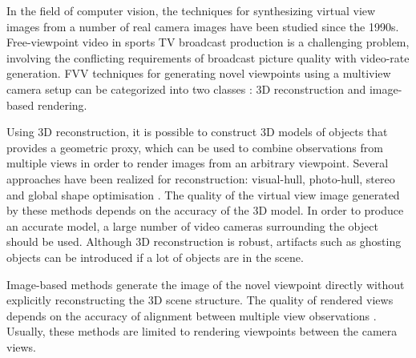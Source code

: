 In the field of computer vision, the techniques for synthesizing virtual view images from a number of real camera
images have been studied since the 1990s.
Free-viewpoint video in sports TV broadcast production is a challenging problem, involving the conflicting requirements of 
broadcast picture quality with video-rate generation.
FVV techniques for generating novel viewpoints using a multiview camera setup can be categorized into two classes 
\cite{05_plane_sweeping}: 3D reconstruction and image-based rendering. 

Using 3D reconstruction, it is possible to construct 3D models of objects that provides a geometric proxy, which can be
used to combine observations from multiple views in order to render images from an arbitrary viewpoint. 
Several approaches have been realized for reconstruction: visual-hull, photo-hull, stereo and 
global shape optimisation \cite{02_iview}.
The quality of the virtual view image generated
by these methods depends on the accuracy of the 3D model. In order to produce an accurate model, a
large number of video cameras surrounding the object should be used. 
Although 3D reconstruction is robust, artifacts such as ghosting objects can be introduced if a lot of objects are in the scene. 

Image-based methods generate the image of the novel viewpoint directly without explicitly reconstructing the 3D scene structure.
The quality of rendered views depends on the accuracy of alignment between multiple view observations 
\cite{05_plane_sweeping,02_iview}.
Usually, these methods are limited to rendering viewpoints between the camera views.





